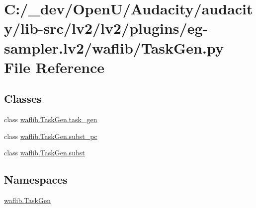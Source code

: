 \hypertarget{lv2_2plugins_2eg-sampler_8lv2_2waflib_2_task_gen_8py}{}\section{C\+:/\+\_\+dev/\+Open\+U/\+Audacity/audacity/lib-\/src/lv2/lv2/plugins/eg-\/sampler.lv2/waflib/\+Task\+Gen.py File Reference}
\label{lv2_2plugins_2eg-sampler_8lv2_2waflib_2_task_gen_8py}
\subsection*{Classes}
\begin{DoxyCompactItemize}
\item 
class \hyperlink{classwaflib_1_1_task_gen_1_1task__gen}{waflib.\+Task\+Gen.\+task\+\_\+gen}
\item 
class \hyperlink{classwaflib_1_1_task_gen_1_1subst__pc}{waflib.\+Task\+Gen.\+subst\+\_\+pc}
\item 
class \hyperlink{classwaflib_1_1_task_gen_1_1subst}{waflib.\+Task\+Gen.\+subst}
\end{DoxyCompactItemize}
\subsection*{Namespaces}
\begin{DoxyCompactItemize}
\item 
 \hyperlink{namespacewaflib_1_1_task_gen}{waflib.\+Task\+Gen}
\end{DoxyCompactItemize}
